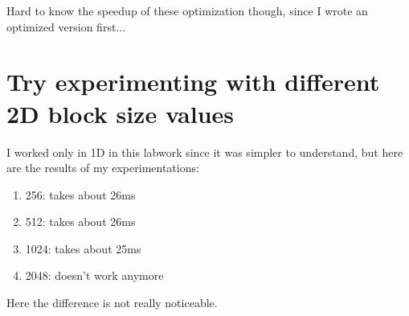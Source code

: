 \documentclass{article}
\begin{document}
Hard to know the speedup of these optimization though, since I wrote an optimized version first...

\section{Try experimenting with different 2D block size values}

I worked only in 1D in this labwork since it was simpler to understand, but here are the results of my experimentations:
\begin{enumerate} 
\item 256: takes about 26ms
\item 512: takes about 26ms
\item 1024: takes about 25ms
\item 2048: doesn't work anymore
\end{enumerate}
Here the difference is not really noticeable.
\end{document}
